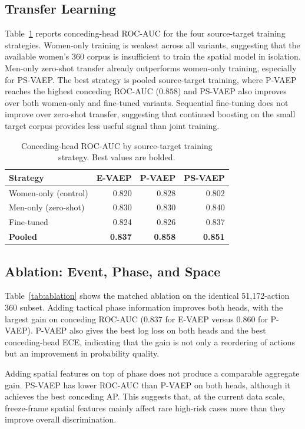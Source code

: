 \documentclass[runningheads]{llncs}
\begin{document}
\subsection{Transfer Learning}
Table~\ref{tab:transfer} reports conceding-head ROC-AUC for the four source-target training strategies. Women-only training is weakest across all variants, suggesting that the available women's 360 corpus is insufficient to train the spatial model in isolation. Men-only zero-shot transfer already outperforms women-only training, especially for PS-VAEP. The best strategy is pooled source-target training, where P-VAEP reaches the highest conceding ROC-AUC ($0.858$) and PS-VAEP also improves over both women-only and fine-tuned variants. Sequential fine-tuning does not improve over zero-shot transfer, suggesting that continued boosting on the small target corpus provides less useful signal than joint training.

\begin{table}[tbp]
\footnotesize
\centering
\caption{Conceding-head ROC-AUC by source-target training strategy. Best values are bolded.}
\label{tab:transfer}
\begin{tabular}{lrrr}
\toprule
\textbf{Strategy} & \textbf{E-VAEP} & \textbf{P-VAEP} & \textbf{PS-VAEP} \\
\midrule
Women-only (control) & 0.820 & 0.828 & 0.802 \\
Men-only (zero-shot) & 0.830 & 0.830 & 0.840 \\
Fine-tuned & 0.824 & 0.826 & 0.837 \\
\textbf{Pooled} & \textbf{0.837} & \textbf{0.858} & \textbf{0.851} \\
\bottomrule
\end{tabular}
\end{table}

\subsection{Ablation: Event, Phase, and Space}
Table~\ref{tab:ablation} shows the matched ablation on the identical 51,172-action 360 subset. Adding tactical phase information improves both heads, with the largest gain on conceding ROC-AUC ($0.837$ for E-VAEP versus $0.860$ for P-VAEP). P-VAEP also gives the best log loss on both heads and the best conceding-head ECE, indicating that the gain is not only a reordering of actions but an improvement in probability quality.

Adding spatial features on top of phase does not produce a comparable aggregate gain. PS-VAEP has lower ROC-AUC than P-VAEP on both heads, although it achieves the best conceding AP. This suggests that, at the current data scale, freeze-frame spatial features mainly affect rare high-risk cases more than they improve overall discrimination.
\end{document}
